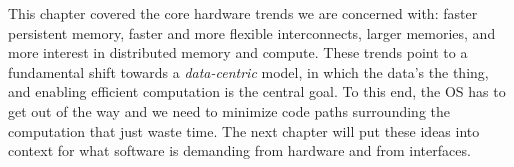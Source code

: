 

\begin{chconc}
    This chapter covered the core hardware trends we are concerned with: faster persistent memory, faster and more flexible
    interconnects, larger memories, and more interest in distributed memory and compute. These trends point to a
    fundamental shift towards a \emph{data-centric} model, in which the data's the thing, and enabling efficient
    computation is the central goal. To this end, the OS has to get out of the way and we need to minimize code paths
    surrounding the computation that just waste time. The next chapter will put these ideas into context for what
    software is demanding from hardware and from interfaces.
\end{chconc}